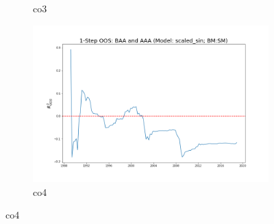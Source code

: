 \documentclass[a4paper,12pt,times,numbered,print,index]{report}
\numberwithin{equation}{section}
\begin{document}
\begin{figure}[!htbp]
\begin{subfigure}[b]{0.42\linewidth}
		\caption{co3}
	\end{subfigure}
	\begin{subfigure}[b]{0.42\linewidth}
		\includegraphics[width=0.9\linewidth]{OOS_plots/scaled_sin_co4_SM.png}
		\caption{co4}
	\end{subfigure}
	\label{g3}
\end{figure}
\end{document}
